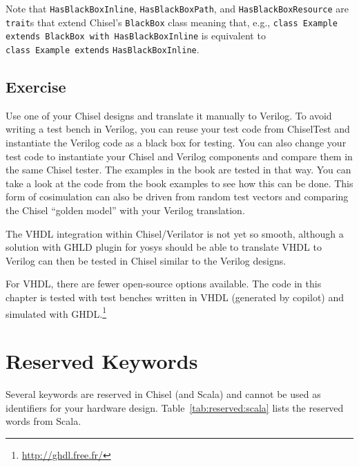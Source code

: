 \documentclass[%
    10pt,
    headinclude, footexclude,
    openright, %
    notitlepage,
    cleardoubleempty,
    headsepline,
    pointlessnumbers,
    bibtotoc, idxtotoc,
    ]{scrbook}
\newcommand{\code}[1]{{\lstinline[basicstyle=\small\ttfamily]{#1}}}
\begin{document}
Note that \code{HasBlackBoxInline}, \code{HasBlackBoxPath}, and \code{HasBlackBoxResource}
are \code{trait}s that extend Chisel's \code{BlackBox} class meaning that, e.g.,
\code{class Example extends BlackBox with HasBlackBoxInline} is equivalent to\\
\code{class Example extends} \code{HasBlackBoxInline}.

\section{Exercise}

Use one of your Chisel designs and translate it manually to Verilog.
To avoid writing a test bench in Verilog, you can reuse your test code from
ChiselTest and instantiate the Verilog code as a black box for testing.
You can also change your test code to instantiate your Chisel and Verilog components
and compare them in the same Chisel tester.
The examples in the book are tested in that way. You can take a look at the
code from the book examples to see how this can be done.
This form of cosimulation can also be driven from random test vectors
and comparing the Chisel ``golden model'' with your Verilog translation.

The VHDL integration within Chisel/Verilator is not yet so smooth, although
a solution with GHLD plugin for yosys should be able to translate VHDL to
Verilog can then be tested in Chisel similar to the Verilog designs.

For VHDL, there are fewer open-source options available.
The code in this chapter is tested with test benches written in VHDL (generated
by copilot) and simulated with GHDL.\footnote{\url{http://ghdl.free.fr/}}

\chapter{Reserved Keywords}
\label{sec:reserved}

Several keywords are reserved in Chisel (and Scala) and cannot be used as identifiers
for your hardware design.
Table~\ref{tab:reserved:scala} lists the reserved words from Scala.
\end{document}
